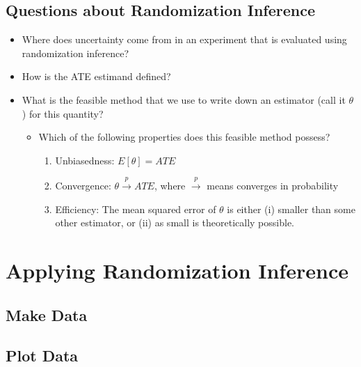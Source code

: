 \documentclass[
]{book}
\providecommand{\tightlist}{%
  \setlength{\itemsep}{0pt}\setlength{\parskip}{0pt}}
\begin{document}
\hypertarget{questions-about-randomization-inference}{%
\subsection{Questions about Randomization
Inference}\label{questions-about-randomization-inference}}

\begin{itemize}
\tightlist
\item
  Where does uncertainty come from in an experiment that is evaluated
  using randomization inference?
\item
  How is the ATE estimand defined?
\item
  What is the feasible method that we use to write down an estimator
  (call it \(\theta\)) for this quantity?

  \begin{itemize}
  \tightlist
  \item
    Which of the following properties does this feasible method possess?

    \begin{enumerate}
    \def\labelenumi{\alph{enumi}.}
    \tightlist
    \item
      Unbiasedness: \(E[\theta] = ATE\)
    \item
      Convergence: \(\theta \overset{p}\rightarrow ATE\), where
      \(\overset{p}\rightarrow\) means converges in probability
    \item
      Efficiency: The mean squared error of \(\theta\) is either (i)
      smaller than some other estimator, or (ii) as small is
      theoretically possible.
    \end{enumerate}
  \end{itemize}
\end{itemize}

\hypertarget{applying-randomization-inference}{%
\section{Applying Randomization
Inference}\label{applying-randomization-inference}}

\hypertarget{make-data}{%
\subsection{Make Data}\label{make-data}}

\hypertarget{plot-data}{%
\subsection{Plot Data}\label{plot-data}}
\end{document}

